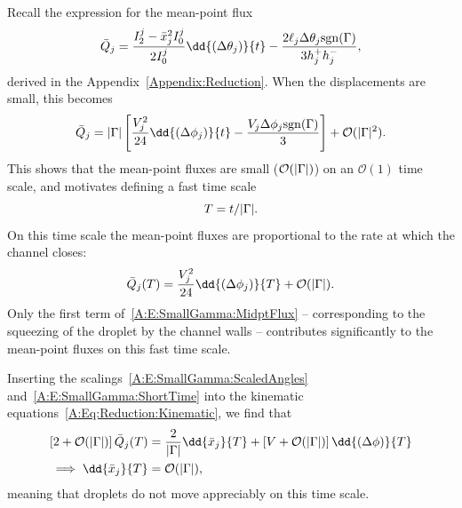 \begin{subappendices}
Recall the expression for the mean-point flux
\begin{equation}\label{A:E:SmallGamma:Midpt_Flux1}
\bar{Q}_j = \frac{I_2^j - \xbar_j^2 I_0^j}{2I_0^j}\dd{(\dthetaj)}{t} - \frac{2\ell_j \dthetaj \sgn (\Gamma)}{3h_j^+ h_j^-},
\end{equation}
derived in the Appendix~\ref{Appendix:Reduction}. When the displacements are small, this becomes
\begin{align}
\bar{Q}_j = \smallpar \left[\frac{V_j^2}{24} \dd{(\dangl_j)}{t} - \frac{V_j \dangl_j \sgn (\Gamma)}{3 }  \right]+ \mathcal{O}(\smallpar^2).\label{A:E:SmallGamma:MidptFlux}
\end{align}
This shows that the mean-point fluxes are small ($\mathcal{O}(|\Gamma|)$) on an $\mathcal{O}(1)$ time scale, and motivates defining a fast time scale
\begin{equation}\label{A:E:SmallGamma:ShortTime}
T = t/|\Gamma|.
\end{equation}
On this time scale the mean-point fluxes are proportional to the rate at which the channel closes:
\begin{equation}\label{A:E:SmallGamma:ShortTimeFlux}
\bar{Q}_j(T) = \frac{V_j^2}{24}\dd{\left(\dangl_{j}\right)}{T} + \mathcal{O}(\smallpar).
\end{equation}
Only the first term of~\eqref{A:E:SmallGamma:MidptFlux} -- corresponding to the squeezing of the droplet by the channel walls -- contributes significantly to the mean-point fluxes on this fast time scale.

Inserting the scalings~\eqref{A:E:SmallGamma:ScaledAngles} and~\eqref{A:E:SmallGamma:ShortTime} into the kinematic equations~\eqref{A:Eq:Reduction:Kinematic}, we find that
\begin{align}
\left[2 + \mathcal{O}(\smallpar)\right]\bar{Q}_j(T) &= \frac{2}{\smallpar}\dd{\xbar_j}{T} + \left[V +\mathcal{O}(\smallpar)\right]\dd{(\dangl)}{T}\label{A:E:SmallGamma:ShortTimeFluxI}\\
\implies \dd{\xbar_j}{T} &= \mathcal{O}(\smallpar),\label{A:E:SmallGamma:ShortTimeFluxII}
\end{align}
meaning that droplets do not move appreciably on this time scale.


\end{subappendices}
